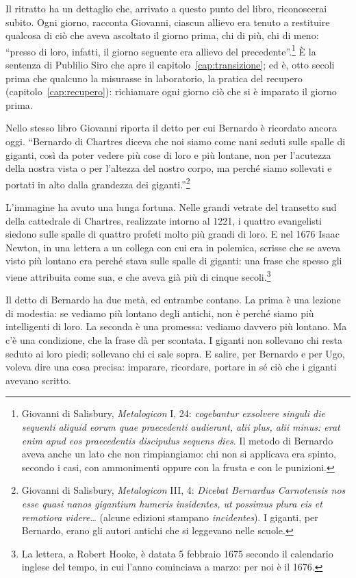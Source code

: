 Il ritratto ha un dettaglio che, arrivato a questo punto del libro,
riconoscerai subito. Ogni giorno, racconta Giovanni, ciascun allievo
era tenuto a restituire qualcosa di ciò che aveva ascoltato il giorno
prima, chi di più, chi di meno: \enquote{presso di loro, infatti, il
giorno seguente era allievo del precedente}.\footnote{Giovanni di
Salisbury, \emph{Metalogicon} I, 24: \emph{cogebantur exsolvere singuli
die sequenti aliquid eorum quae praecedenti audierant, alii plus, alii
minus: erat enim apud eos praecedentis discipulus sequens dies}. Il
metodo di Bernardo aveva anche un lato che non rimpiangiamo: chi non
si applicava era spinto, secondo i casi, con ammonimenti oppure con la
frusta e con le punizioni.} È la sentenza di Publilio Siro che apre il
capitolo~\ref{cap:transizione}; ed è, otto secoli prima che qualcuno la
misurasse in laboratorio, la pratica del recupero
(capitolo~\ref{cap:recupero}): richiamare ogni giorno ciò che si è
imparato il giorno prima.

Nello stesso libro Giovanni riporta il detto per cui Bernardo è
ricordato ancora oggi. \enquote{Bernardo di Chartres diceva che noi
siamo come nani seduti sulle spalle di giganti, così da poter vedere
più cose di loro e più lontane, non per l'acutezza della nostra vista o
per l'altezza del nostro corpo, ma perché siamo sollevati e portati in
alto dalla grandezza dei giganti.}\footnote{Giovanni di Salisbury,
\emph{Metalogicon} III, 4: \emph{Dicebat Bernardus Carnotensis nos esse
quasi nanos gigantium humeris insidentes, ut possimus plura eis et
remotiora videre}… (alcune edizioni stampano \emph{incidentes}). I
giganti, per Bernardo, erano gli autori antichi che si leggevano nelle
scuole.}

L'immagine ha avuto una lunga fortuna. Nelle grandi vetrate del
transetto sud della cattedrale di Chartres, realizzate intorno al 1221,
i quattro evangelisti siedono sulle spalle di quattro profeti molto più
grandi di loro. E nel 1676 Isaac Newton, in una lettera a un collega
con cui era in polemica, scrisse che se aveva visto più lontano era
perché stava sulle spalle di giganti: una frase che spesso gli viene
attribuita come sua, e che aveva già più di cinque secoli.\footnote{La
lettera, a Robert Hooke, è datata 5 febbraio 1675 secondo il calendario
inglese del tempo, in cui l'anno cominciava a marzo: per noi è il
1676.}

Il detto di Bernardo ha due metà, ed entrambe contano. La prima è una
lezione di modestia: se vediamo più lontano degli antichi, non è perché
siamo più intelligenti di loro. La seconda è una promessa: vediamo
davvero più lontano. Ma c'è una condizione, che la frase dà per
scontata. I giganti non sollevano chi resta seduto ai loro piedi;
sollevano chi ci sale sopra. E salire, per Bernardo e per Ugo, voleva
dire una cosa precisa: imparare, ricordare, portare in sé ciò che i
giganti avevano scritto.

